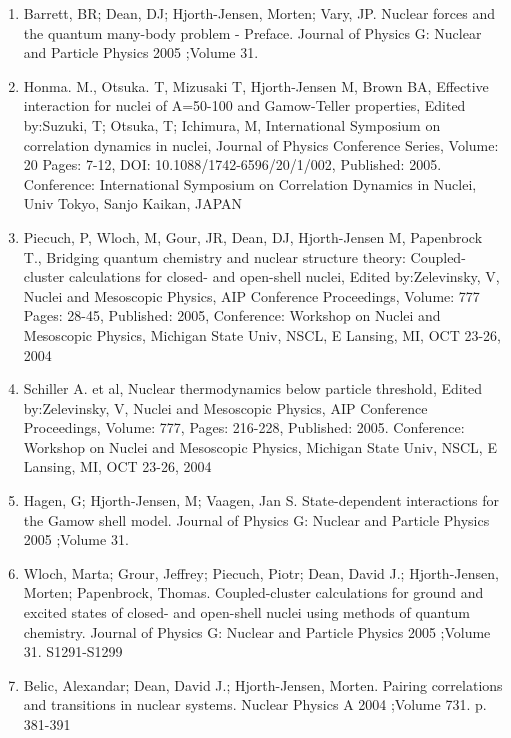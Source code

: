 \documentclass[%
oneside,                 %
final,                   %
10pt]{article}
\begin{document}
\begin{enumerate}
\item Barrett, BR; Dean, DJ; Hjorth-Jensen, Morten; Vary, JP.  Nuclear forces and the quantum many-body problem - Preface. Journal of Physics G: Nuclear and Particle Physics 2005 ;Volume 31.

\item Honma. M., Otsuka. T, Mizusaki T, Hjorth-Jensen M, Brown BA, Effective interaction for nuclei of A=50-100 and Gamow-Teller properties, Edited by:Suzuki, T; Otsuka, T; Ichimura, M, International Symposium on correlation dynamics in nuclei, Journal of Physics Conference Series, Volume: 20  Pages: 7-12, DOI: 10.1088/1742-6596/20/1/002, Published: 2005. Conference: International Symposium on Correlation Dynamics in Nuclei, Univ Tokyo, Sanjo Kaikan, JAPAN

\item Piecuch, P, Wloch, M,  Gour, JR, Dean, DJ, Hjorth-Jensen M,  Papenbrock T., Bridging quantum chemistry and nuclear structure theory: Coupled-cluster calculations for closed- and open-shell nuclei, Edited by:Zelevinsky, V, Nuclei and Mesoscopic Physics, AIP Conference Proceedings, Volume: 777  Pages: 28-45, Published: 2005, Conference: Workshop on Nuclei and Mesoscopic Physics, Michigan State Univ, NSCL, E Lansing, MI, OCT 23-26, 2004

\item Schiller A. et al,  Nuclear thermodynamics below particle threshold, Edited by:Zelevinsky, V, Nuclei and Mesoscopic Physics, AIP Conference Proceedings, Volume: 777, Pages: 216-228, Published: 2005. Conference: Workshop on Nuclei and Mesoscopic Physics, Michigan State Univ, NSCL, E Lansing, MI, OCT 23-26, 2004

\item Hagen, G; Hjorth-Jensen, M; Vaagen, Jan S.  State-dependent interactions for the Gamow shell model. Journal of Physics G: Nuclear and Particle Physics 2005 ;Volume 31. 

\item Wloch, Marta; Grour, Jeffrey; Piecuch, Piotr; Dean, David J.; Hjorth-Jensen, Morten; Papenbrock, Thomas.  Coupled-cluster calculations for ground and excited states of closed- and open-shell nuclei using methods of quantum chemistry. Journal of Physics G: Nuclear and Particle Physics 2005 ;Volume 31.  S1291-S1299

\item Belic, Alexandar; Dean, David J.; Hjorth-Jensen, Morten.  Pairing correlations and transitions in nuclear systems. Nuclear Physics A 2004 ;Volume 731. p. 381-391


\end{enumerate}
\end{document}
